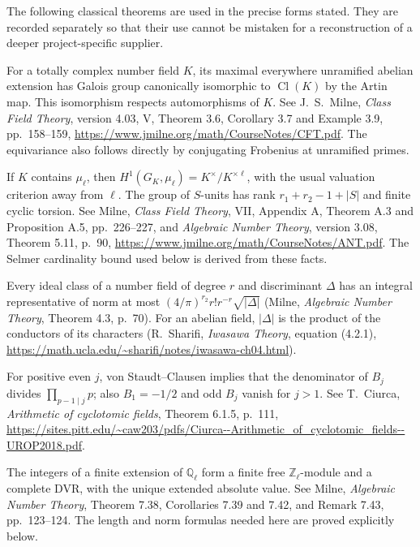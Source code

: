 The following classical theorems are used in the precise forms stated.
They are recorded separately so that their use cannot be mistaken for
a reconstruction of a deeper project-specific supplier.
\begin{description}[style=nextline,leftmargin=0pt,labelwidth=0pt,labelsep=0pt]
\item[OB-CF: unramified class-field reciprocity.]
\label{ob-ref-classfield}
For a totally complex number field $K$, its maximal everywhere
unramified abelian extension has Galois group canonically isomorphic
to $\operatorname{Cl}(K)$ by the Artin map.  This isomorphism respects
automorphisms of $K$.  See J.~S.~Milne, \emph{Class Field Theory},
version 4.03, V, Theorem 3.6, Corollary 3.7 and Example 3.9,
pp.~158--159, \url{https://www.jmilne.org/math/CourseNotes/CFT.pdf}.
The equivariance also follows directly by conjugating Frobenius at
unramified primes.

\item[OB-KU: Kummer theory and the unit theorem.]
\label{ob-ref-kummer}
If $K$ contains $\mu_\ell$, then
$H^1(G_K,\mu_\ell)=K^\times/K^{\times\ell}$, with the usual
valuation criterion away from $\ell$.  The group of $S$-units has
rank $r_1+r_2-1+|S|$ and finite cyclic torsion.  See Milne,
\emph{Class Field Theory}, VII, Appendix A, Theorem A.3 and
Proposition A.5, pp.~226--227, and \emph{Algebraic Number Theory},
version 3.08, Theorem 5.11, p.~90,
\url{https://www.jmilne.org/math/CourseNotes/ANT.pdf}.
The Selmer cardinality bound used below is derived from these facts.

\item[OB-MD: ideal representatives and abelian discriminants.]
\label{ob-ref-minkowski}
Every ideal class of a number field of degree $r$ and discriminant
$\Delta$ has an integral representative of norm at most
$(4/\pi)^{r_2}r!r^{-r}\sqrt{|\Delta|}$ (Milne,
\emph{Algebraic Number Theory}, Theorem 4.3, p.~70).
For an abelian field, $|\Delta|$ is the product of the conductors of
its characters (R.~Sharifi, \emph{Iwasawa Theory}, equation (4.2.1),
\url{https://math.ucla.edu/~sharifi/notes/iwasawa-ch04.html}).

\item[OB-BC: Bernoulli denominators.]
\label{ob-ref-bernoulli}
For positive even $j$, von Staudt--Clausen implies that the
denominator of $B_j$ divides $\prod_{p-1\mid j}p$; also
$B_1=-1/2$ and odd $B_j$ vanish for $j>1$.
See T.~Ciurca, \emph{Arithmetic of cyclotomic fields},
Theorem 6.1.5, p.~111,
\url{https://sites.pitt.edu/~caw203/pdfs/Ciurca--Arithmetic_of_cyclotomic_fields--UROP2018.pdf}.

\item[OB-LF: finite extensions of local fields.]
\label{ob-ref-local}
The integers of a finite extension of $\mathbb Q_\ell$ form a finite
free $\mathbb Z_\ell$-module and a complete DVR, with the unique
extended absolute value.  See Milne, \emph{Algebraic Number Theory},
Theorem 7.38, Corollaries 7.39 and 7.42, and Remark 7.43,
pp.~123--124.  The length and norm formulas needed here are proved
explicitly below.
\end{description}

